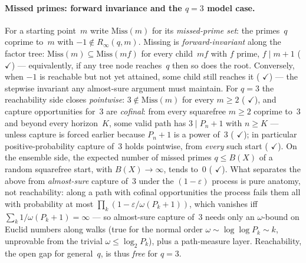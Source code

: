 \paragraph{Missed primes: forward invariance and the $q=3$ model case.}
For a starting point~$m$ write $\mathrm{Miss}(m)$ for its
\emph{missed-prime set}: the primes~$q$ coprime to~$m$ with
$-1 \notin R_\infty(q,m)$.  Missing is \emph{forward-invariant} along
the factor tree: $\mathrm{Miss}(m) \subseteq \mathrm{Miss}(mf)$ for
every child~$mf$ with $f$ prime, $f \mid m{+}1$
(
{\color{leanink}$\checkmark$}) --- equivalently, if any tree node
reaches~$q$ then so does the root.  Conversely, when $-1$ is reachable
but not yet attained, some child still reaches it
(
{\color{leanink}$\checkmark$}) --- the stepwise invariant any
almost-sure argument must maintain.  For $q = 3$ the reachability side
closes \emph{pointwise}: $3 \notin \mathrm{Miss}(m)$ for every
$m \geq 2$
(
{\color{leanink}$\checkmark$}), and capture opportunities for~$3$ are
\emph{cofinal}: from every squarefree $m \geq 2$ coprime to~$3$ and
beyond every horizon~$K$, some valid path has $3 \mid P_n{+}1$ with
$n \geq K$ --- unless capture is forced earlier because $P_n{+}1$ is a
power of~$3$
(
{\color{leanink}$\checkmark$}); in particular positive-probability
capture of~$3$ holds pointwise, from \emph{every} such start
(
{\color{leanink}$\checkmark$}).  On the ensemble side, the expected
number of missed primes $q \leq B(X)$ of a random squarefree start,
with $B(X) \to \infty$, tends to~$0$
(
{\color{leanink}$\checkmark$}).  What separates the above from
\emph{almost-sure} capture of~$3$ under the $(1{-}\varepsilon)$
process is pure anatomy, not reachability: along a path with cofinal
opportunities the process fails them all with probability at most
$\prod_k (1 - \varepsilon/\omega(P_k{+}1))$, which vanishes iff
$\sum_k 1/\omega(P_k{+}1) = \infty$ --- so almost-sure capture of~$3$
needs only an $\omega$-bound on Euclid numbers along walks (true for
the normal order $\omega \sim \log\log P_k \sim k$, unprovable from
the trivial $\omega \leq \log_2 P_k$), plus a path-measure layer.
Reachability, the open gap for general~$q$, is thus \emph{free} for
$q = 3$.

